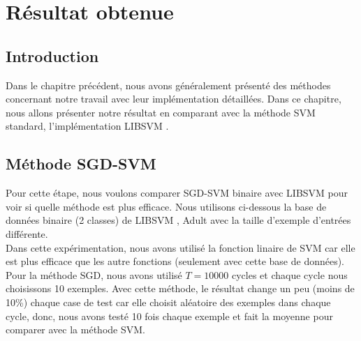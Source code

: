 \chapter{Résultat obtenue}
\label{chap:res}

\section{Introduction}
Dans le chapitre précédent, nous avons généralement présenté des méthodes concernant notre travail avec leur implémentation détaillées. Dans ce chapitre, nous allons présenter notre résultat en comparant avec la méthode SVM standard, l'implémentation LIBSVM \cite{cl01}.

\section{Méthode SGD-SVM}
Pour cette étape, nous voulons comparer SGD-SVM binaire avec LIBSVM pour voir si quelle méthode est plus efficace. Nous utilisons ci-dessous la base de données binaire (2 classes) de LIBSVM \cite{svmdata1}, Adult avec la taille d'exemple d'entrées différente.\\

Dans cette expérimentation, nous avons utilisé la fonction linaire de SVM car elle est plus efficace que les autre fonctions (seulement avec cette base de données). Pour la méthode SGD, nous avons utilisé $T = 10000$ cycles et chaque cycle nous choisissons 10 exemples. Avec cette méthode, le résultat change un peu (moins de 10\%) chaque case de test car elle choisit aléatoire des exemples dans chaque cycle, donc, nous avons testé 10 fois chaque exemple et fait la moyenne pour comparer avec la méthode SVM.

